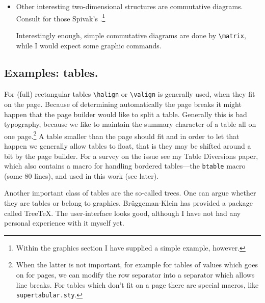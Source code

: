 \begin{itemize}
$${{{{ \times&\times\cr
0     &0     &\times&\times&&\times&
 \times&\times\cr
0     &0     &0     &\times&&\times&
 \times&\times\cr
\noalign{\vglue1ex}
\multispan8\dotfill\cr
0     &0     &0     &0     &&\times&
 \times&\times\cr
0     &0     &0     &0     &&\times&
 \times&\times\cr
0     &0     &0     &0     &&\times&
\times&\times\cr}%
}%
\right)\cr %
\noalign{\vglue1ex}
{}&\hfil\enspace\mathop{\hbox to.9cm{%
   \upbracefill}}\limits_{\vbox{\kern2pt
                      \icurt42}}
   \enspace\hfil
   \mathop{\hbox to.6cm{%
   \upbracefill}}\limits_{\vbox{\kern2pt
     \icmat4{1.5}}}\enspace\hfil%
\cr  %
}%
}%
$$
\item Other interesting two-dimensional
structures are commutative diagrams. Consult for those Spivak's
\LAMSTeX.\footnote{Within the graphics section I
         have supplied a simple example, however.}

\noindent Interestingly enough, simple commutative diagrams are done by
\verb|\matrix|, while I would expect some graphic commands.
\end{itemize}
\endgroup

\subsection{Examples: tables.}
For (full) rectangular tables \verb|\halign| or \verb|\valign| is generally
used, when they fit on the page.
Because of determining automatically the page breaks it might happen that
the page builder would like to split a table. Generally this is bad
typography, because we like to maintain the summary character of a table
all on one page.\footnote{When the latter is not important, for example for
   tables of values which goes on for pages, we can modify
   the row separator into a separator which allows line breaks.
   For tables which don't fit on a page
   there are special macros, like {\tt supertabular.sty}.}
A table smaller than the page should fit and in order to let that happen
we generally allow tables to float, that is they may be shifted around
a bit by the page builder.
For a survey on the issue see my Table Diversions paper, which also contains
a macro for handling bordered tables---the {\tt btable} macro (some 80 lines),
and used in this work (see later).

   Another important class of tables are the so-called trees. One can argue
whether they are tables or belong to graphics. Br\"uggeman-Klein has provided
a package called Tree\TeX. The user-interface looks good,
although I have not had any personal experience with it myself yet.

